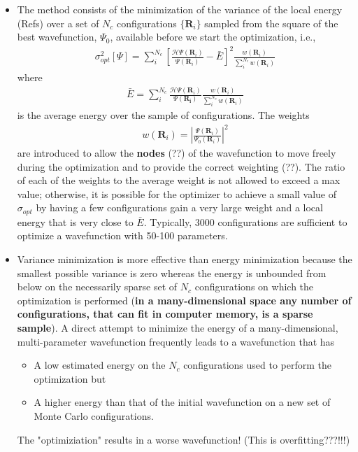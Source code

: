 \documentclass[twoside,english]{uiofysmaster}
\begin{document}
\begin{itemize}
	\item The method consists of the minimization of the variance of the local energy (Refs) over a set of $N_c$ configurations $\{ \bm{R}_i \}$ sampled from the square of the best wavefunction, $\Psi_0$, available before we start the optimization, i.e.,
	\begin{align}
		\sigma_{opt}^2 [\Psi] = \sum_i^{N_c} [ \frac{ \mathcal{H}\Psi(\bm{R}_i) }{ \Psi(\bm{R}_i) } - \bar{E} ]^2
		\frac{ w(\bm{R}_i) }{ \sum_i^{N_c} w(\bm{R}_i) }
	\end{align}
	where 
	\begin{align}
		\bar{E} = \sum_i^{N_c} \frac{ \mathcal{H} \Psi(\bm{R}_i) }{ \Psi(\bm{R_i}) }
		\frac{ w(\bm{R}_i) }{ \sum_i^{N_c} w(\bm{R}_i) } 
	\end{align}
	is the average energy over the sample of configurations. The weights
	\begin{align}
		w(\bm{R}_i) = | \frac{ \Psi(\bm{R}_i) }{ \Psi_0 (\bm{R}_i) } |^2
	\end{align}
	are introduced to allow the \textbf{nodes} (??) of the wavefunction to move freely during the optimization and to provide the correct weighting (??). The ratio of each of the weights to the average weight is not allowed to exceed a max value; otherwise, it is possible for the optimizer to achieve a small value of $\sigma_{opt}$ by having a few configurations gain a very large weight and a local energy that is very close to $\bar{E}$. Typically, 3000 configurations are sufficient to optimize a wavefunction with 50-100 parameters.
	\item Variance minimization is more effective than energy minimization because the smallest possible variance is zero whereas the energy is unbounded from below on the necessarily sparse set of $N_c$ configurations on which the optimization is performed (\textbf{in a many-dimensional space any number of configurations, that can fit in computer memory, is a sparse sample}). A direct attempt to minimize the energy of a many-dimensional, multi-parameter wavefunction frequently leads to a wavefunction that has
	\begin{itemize}
		\item A low estimated energy on the $N_c$ configurations used to perform the optimization but 
		\item A higher energy than that of the initial wavefunction on a new set of Monte Carlo configurations.
	\end{itemize}
	The "optimiziation" results in a worse wavefunction! (This is overfitting???!!!)

\end{itemize}
\end{document}
